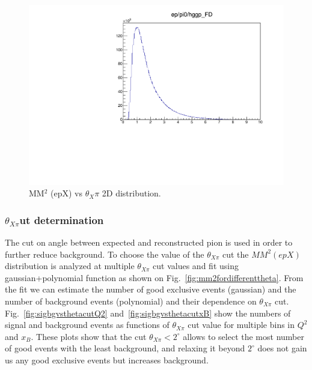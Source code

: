     \begin{figure}
        \centering
       \includegraphics[page=10,width=0.97\linewidth]{Chapters/Ch4-BaseAnalysis/1_Event_Selection_Cuts/figures/eppi0.exclusive.pdf}
    	\caption{MM$^2$ (epX) vs $\theta_X\pi$ 2D distribution.}
    	\label{fig:MM2vsThetaXPi}
    \end{figure}


   

    \subsubsection{\texorpdfstring{$\theta_{X\pi}$} cut determination}
    
    The cut on angle between expected and reconstructed pion is used in order to further reduce background.
    To choose the value of the $\theta_{X\pi}$ cut the $MM^2(epX)$ distribution is analyzed at multiple $\theta_{X\pi}$ cut values and fit using gaussian+polynomial function as shown on Fig.~\ref{fig:mm2fordifferenttheta}.
    From the fit we can estimate the number of good exclusive events (gaussian) and the number of background events (polynomial) and their dependence on $\theta_{X\pi}$ cut.
    Fig.~\ref{fig:sigbgvsthetacutQ2} and~\ref{fig:sigbgvsthetacutxB} show the numbers of signal and background events as functions of $\theta_{X\pi}$ cut value for multiple bins in $Q^2$ and $x_B$.
    These plots show that the cut $\theta_{X\pi}<2^\circ$ allows to select the most number of good events with the least background, and relaxing it beyond $2^\circ$ does not gain us any good exclusive events but increases background.
    
